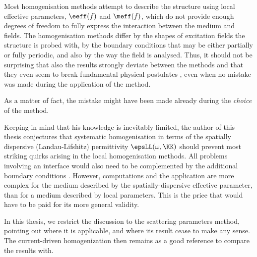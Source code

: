Most homogenisation methods attempt to describe the structure using local effective parameters,  $\eeff(f)$ and $\meff(f)$, which do not provide enough degrees of freedom to fully express the interaction between the medium and fields. The homogenisation methods differ by the shapes of excitation fields the structure is probed with, by the  boundary conditions that may be either partially or fully periodic, and also by the way the field is analysed. Thus, it should not be surprising that also the results strongly deviate between the methods \cite[Fig. 5]{smith2006homogenization} %
and that they even seem to break fundamental physical postulates \cite{koschny2003resonant}, even when no mistake was made during the application of the method. 

As a matter of fact, the mistake might have been made already during the \textit{choice} of the method.

Keeping in mind that his knowledge is inevitably limited, the author of this thesis conjectures that systematic homogenisation in terms of the spatially dispersive (Landau-Lifshitz) permittivity $\epsLL(\omega,\KK)$ should prevent most striking quirks arising in the local homogenisation methods. All problems involving an interface would also need to be complemented by the additional boundary conditions \cite{agranovich2006spatial}.
However, computations and the application are more complex for the medium described by the spatially-dispersive effective parameter, than for a medium described by local parameters. This is the price that would have to be paid for its more general validity.

In this thesis, we restrict the discussion to the scattering parameters method, pointing out where it is applicable, and where its result cease to make any sense. The current-driven homogenization then remains as a good reference to compare the results with.






